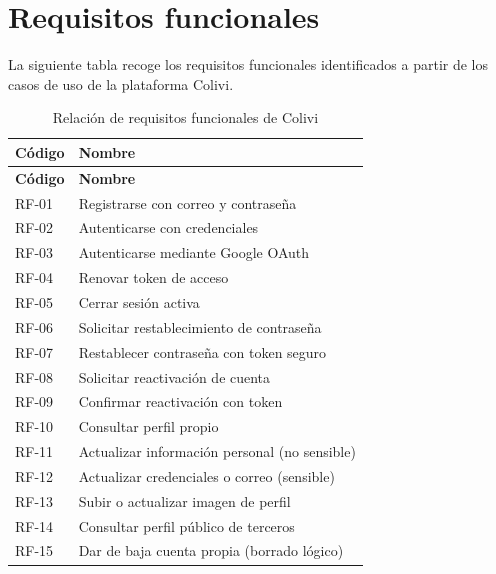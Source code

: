 \section{Requisitos funcionales}

La siguiente tabla recoge los requisitos funcionales identificados a partir de los casos de uso de la plataforma Colivi.

\begin{longtable}{|p{2cm}|p{12cm}|}
    \caption{Relación de requisitos funcionales de Colivi}
    \label{tab:requisitos-funcionales} \\
    \hline
    \textbf{Código} & \textbf{Nombre} \\ \hline
    \endfirsthead

    \hline
    \textbf{Código} & \textbf{Nombre} \\ \hline
    \endhead

    RF-01 & Registrarse con correo y contraseña \\ \hline
    RF-02 & Autenticarse con credenciales \\ \hline
    RF-03 & Autenticarse mediante Google OAuth \\ \hline
    RF-04 & Renovar token de acceso \\ \hline
    RF-05 & Cerrar sesión activa \\ \hline
    RF-06 & Solicitar restablecimiento de contraseña \\ \hline
    RF-07 & Restablecer contraseña con token seguro \\ \hline
    RF-08 & Solicitar reactivación de cuenta \\ \hline
    RF-09 & Confirmar reactivación con token \\ \hline
    RF-10 & Consultar perfil propio \\ \hline
    RF-11 & Actualizar información personal (no sensible) \\ \hline
    RF-12 & Actualizar credenciales o correo (sensible) \\ \hline
    RF-13 & Subir o actualizar imagen de perfil \\ \hline
    RF-14 & Consultar perfil público de terceros \\ \hline
    RF-15 & Dar de baja cuenta propia (borrado lógico) \\ \hline


\end{longtable}
